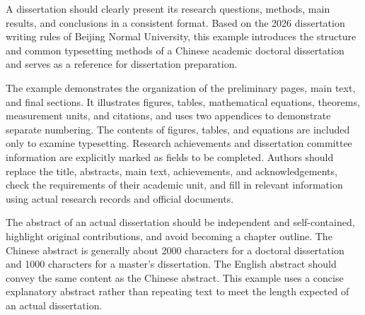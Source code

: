 
\begin{abstract}
  学位论文需要清晰呈现研究问题、研究方法、主要结果和结论，并采用统一的编排格式。本示例依据《北京师范大学研究生学位论文编写规则（2026 版）》，说明中文学术博士学位论文的基本组成和常见排版方法，供作者准备论文时参照。

  示例依次展示前置部分、正文和文后部分的组织方式，给出图表、数学公式、定理、计量单位和文献引用的使用方法，并通过两份附录演示独立编号。图表及公式中的内容仅用于检查排版效果，学术成果和答辩委员会信息均明确标为待填写内容。作者使用模板时，应替换题名、摘要、正文、成果及致谢，核对培养单位要求，并以实际研究记录和正式材料为依据填写相关信息。

  实际论文摘要应具有独立性和自含性，突出研究的创新点，避免写成章节提纲。博士论文的中文摘要一般约为 2000 字，硕士论文一般约为 1000 字；英文摘要应与中文摘要内容对应。本例采用简短的说明性摘要，不以重复文字满足真实论文的篇幅要求。

\end{abstract}

\begin{abstract*}
  A dissertation should clearly present its research questions, methods, main results, and conclusions in a consistent format. Based on the 2026 dissertation writing rules of Beijing Normal University, this example introduces the structure and common typesetting methods of a Chinese academic doctoral dissertation and serves as a reference for dissertation preparation.

  The example demonstrates the organization of the preliminary pages, main text, and final sections. It illustrates figures, tables, mathematical equations, theorems, measurement units, and citations, and uses two appendices to demonstrate separate numbering. The contents of figures, tables, and equations are included only to examine typesetting. Research achievements and dissertation committee information are explicitly marked as fields to be completed. Authors should replace the title, abstracts, main text, achievements, and acknowledgements, check the requirements of their academic unit, and fill in relevant information using actual research records and official documents.

  The abstract of an actual dissertation should be independent and self-contained, highlight original contributions, and avoid becoming a chapter outline. The Chinese abstract is generally about 2000 characters for a doctoral dissertation and 1000 characters for a master's dissertation. The English abstract should convey the same content as the Chinese abstract. This example uses a concise explanatory abstract rather than repeating text to meet the length expected of an actual dissertation.

\end{abstract*}
